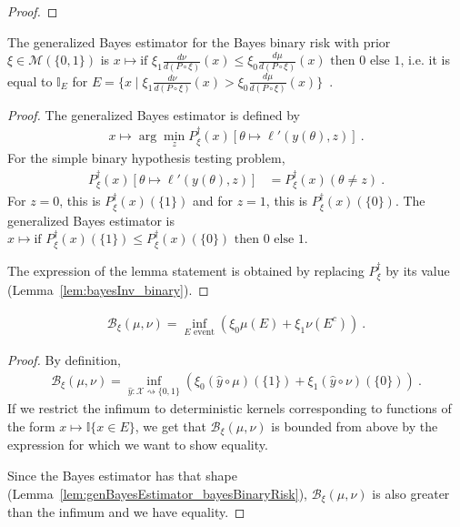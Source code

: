 \begin{proof}\leanok
\uses{}

\end{proof}

\begin{lemma}
  \label{lem:genBayesEstimator_bayesBinaryRisk}
  The generalized Bayes estimator for the Bayes binary risk with prior $\xi \in \mathcal M(\{0,1\})$ is $x \mapsto \text{if } \xi_1\frac{d \nu}{d(P \circ \xi)}(x) \le \xi_0\frac{d \mu}{d(P \circ \xi)}(x) \text{ then } 0 \text{ else } 1$, i.e. it is equal to $\mathbb{I}_E$ for $E = \{x \mid \xi_1\frac{d \nu}{d(P \circ \xi)}(x) > \xi_0\frac{d \mu}{d(P \circ \xi)}(x)\}$~.
\end{lemma}

\begin{proof}%
{}
The generalized Bayes estimator is defined by
\begin{align*}
x \mapsto \arg\min_z P_\xi^\dagger(x)\left[\theta \mapsto \ell'(y(\theta), z)\right] \: .
\end{align*}
For the simple binary hypothesis testing problem,
\begin{align*}
P_\xi^\dagger(x)\left[\theta \mapsto \ell'(y(\theta), z)\right]
&= P_\xi^\dagger(x)(\theta \ne z)
\: .
\end{align*}
For $z = 0$, this is $P_\xi^\dagger(x)(\{1\})$ and for $z = 1$, this is $P_\xi^\dagger(x)(\{0\})$.
The generalized Bayes estimator is $x \mapsto \text{if } P_\xi^\dagger(x)(\{1\}) \le P_\xi^\dagger(x)(\{0\}) \text{ then } 0 \text{ else } 1$.

The expression of the lemma statement is obtained by replacing $P_\xi^\dagger$ by its value (Lemma~\ref{lem:bayesInv_binary}).
\end{proof}


\begin{lemma}
  \label{lem:bayesBinaryRisk_eq_event}
  \leanok
  \begin{align*}
  \mathcal B_\xi(\mu, \nu) = \inf_{E \text{ event}} \left( \xi_0 \mu(E) + \xi_1 \nu(E^c) \right) \: .
  \end{align*}
\end{lemma}

\begin{proof}%
{}
By definition,
\begin{align*}
\mathcal B_\xi(\mu, \nu)
= \inf_{\hat{y} : \mathcal X \rightsquigarrow \{0,1\}}\left(\xi_0 (\hat{y} \circ \mu)(\{1\}) + \xi_1 (\hat{y} \circ \nu)(\{0\})\right)
\: .
\end{align*}
If we restrict the infimum to deterministic kernels corresponding to functions of the form $x \mapsto \mathbb{I}\{x \in E\}$, we get that $\mathcal B_\xi(\mu, \nu)$ is bounded from above by the expression for which we want to show equality.

Since the Bayes estimator has that shape (Lemma~\ref{lem:genBayesEstimator_bayesBinaryRisk}), $\mathcal B_\xi(\mu, \nu)$ is also greater than the infimum and we have equality.
\end{proof}


